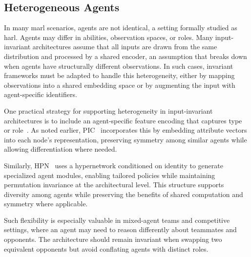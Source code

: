 \documentclass{article}
\begin{document}
\begin{comment}
    They propose a very similar question:
        "Sensory substitution refers to the brain’s ability to use one sensory modality 
        (e.g., touch) to supply environmental information normally gathered by 
        another sense (e.g., vision)."
    - Extremely similar to my interest in sensory degradation.
    - However, in their experiments they instead demonstrate an invariance in a singular
    observational domain. (They take a 2d image, chunk it and shuffle.)
\end{comment}

\subsection{Heterogeneous Agents}
In many \gls{marl} scenarios, agents are not identical, a setting formally studied 
as \gls{harl}. Agents may differ in abilities, observation spaces, or roles. 
Many input-invariant architectures assume that all inputs are drawn from the 
same distribution and processed by a shared encoder, an assumption that breaks 
down when agents have structurally different observations. In such cases, 
invariant frameworks must be adapted to handle this heterogeneity, 
either by mapping observations into a shared embedding space or by 
augmenting the input with agent-specific identifiers.

One practical strategy for supporting heterogeneity in input-invariant architectures 
is to include an agent-specific feature encoding that captures type or 
role~\cite{liu2020b,hao2022,hao2023}. As noted earlier, PIC~\cite{liu2020b}
incorporates this by embedding attribute vectors into each node's representation, 
preserving symmetry among similar agents while allowing differentiation where needed.

Similarly, HPN~\cite{hao2023} uses a hypernetwork conditioned on 
identity to generate specialized agent modules, enabling tailored policies 
while maintaining permutation invariance at the architectural level. 
This structure supports diversity among agents while preserving the 
benefits of shared computation and symmetry where applicable.

Such flexibility is especially valuable in mixed-agent teams and 
competitive settings, where an agent may need to reason differently 
about teammates and opponents. The architecture should remain invariant 
when swapping two equivalent opponents but avoid conflating agents 
with distinct roles.
\end{document}
